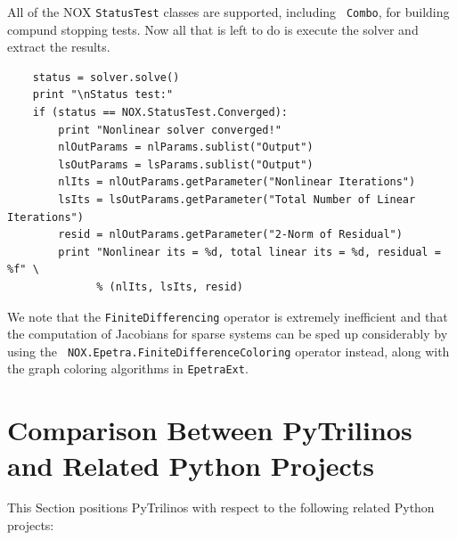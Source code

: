 \documentclass[acmtocl]{acmtrans2m}
\begin{document}
All of the NOX {\tt StatusTest} classes are supported, including {\tt
  Combo}, for building compund stopping tests.  Now all that is left
to do is execute the solver and extract the results.
\begin{verbatim}
    status = solver.solve()
    print "\nStatus test:"
    if (status == NOX.StatusTest.Converged):
        print "Nonlinear solver converged!"
        nlOutParams = nlParams.sublist("Output")
        lsOutParams = lsParams.sublist("Output")
        nlIts = nlOutParams.getParameter("Nonlinear Iterations")
        lsIts = lsOutParams.getParameter("Total Number of Linear Iterations")
        resid = nlOutParams.getParameter("2-Norm of Residual")
        print "Nonlinear its = %d, total linear its = %d, residual = %f" \
              % (nlIts, lsIts, resid)
\end{verbatim}
We note that the {\tt FiniteDifferencing} operator is extremely
inefficient and that the computation of Jacobians for sparse systems
can be sped up considerably by using the {\tt
  NOX.Epetra.FiniteDifferenceColoring} operator instead, along with
the graph coloring algorithms in {\tt EpetraExt}.

\section{Comparison Between PyTrilinos and Related Python Projects}
\label{sec:comparison_python}

This Section positions PyTrilinos with respect to the following related
Python projects:
\end{document}
